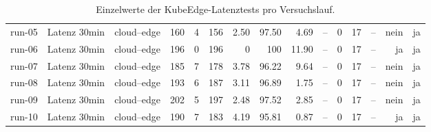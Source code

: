 \begin{table}
\begin{tabular}{l l p{3.2cm} r r r r r r r r r r r r}
run-05 & Latenz 30min & cloud--edge & 160 & 4 & 156 & 2.50 & 97.50 & 4.69 & -- & 0 & 17 & -- & nein & ja \\
run-06 & Latenz 30min & cloud--edge & 196 & 0 & 196 & 0 & 100 & 11.90 & -- & 0 & 17 & -- & ja & ja \\
run-07 & Latenz 30min & cloud--edge & 185 & 7 & 178 & 3.78 & 96.22 & 9.64 & -- & 0 & 17 & -- & nein & ja \\
run-08 & Latenz 30min & cloud--edge & 193 & 6 & 187 & 3.11 & 96.89 & 1.75 & -- & 0 & 17 & -- & nein & ja \\
run-09 & Latenz 30min & cloud--edge & 202 & 5 & 197 & 2.48 & 97.52 & 2.85 & -- & 0 & 17 & -- & nein & ja \\
run-10 & Latenz 30min & cloud--edge & 190 & 7 & 183 & 4.19 & 95.81 & 0.87 & -- & 0 & 17 & -- & ja & ja \\
\bottomrule
\end{tabular}
\caption{Einzelwerte der KubeEdge-Latenztests pro Versuchslauf.}
\label{tab:appendix-kubeedge-latency-runs}
\end{table}
